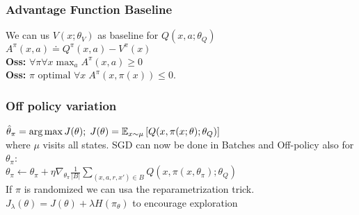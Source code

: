 \subsubsection{Advantage Function Baseline}
We can us $V(x;\theta_V)$ as baseline for $Q(x,a;\theta_Q)$\\
$A^\pi(x,a) \doteq Q^\pi(x,a)-V^\pi(x)$\\
\textbf{Oss:} $\forall\pi \forall x \max_a A^\pi(x,a)\geq 0$\\
\textbf{Oss:} $\pi \text{ optimal } \forall x  \;A^\pi(x,\pi(x))\leq 0$.

\subsubsection{Off policy variation}
{\scriptsize $\hat{\theta}_\pi = \operatorname*{arg\,max} J(\theta); \; J(\theta)=\mathbb{E}_{x\sim\mu}\left[Q(x,\pi(x;\theta);\theta_Q)\right]$}\\
where $\mu$ visits all states. SGD can now be done in Batches and Off-policy also for $\theta_\pi$:\\
$\theta_\pi \gets \theta_\pi + \eta \nabla_{\theta_\pi} \frac{1}{|B|}\sum_{(x,a,r,x')\in B}Q(x,\pi(x,\theta_\pi);\theta_Q)$\\
If $\pi$ is randomized we can usa the reparametrization trick.\\
$J_\lambda (\theta) = J(\theta) + \lambda H(\pi_\theta)$ to encourage exploration







